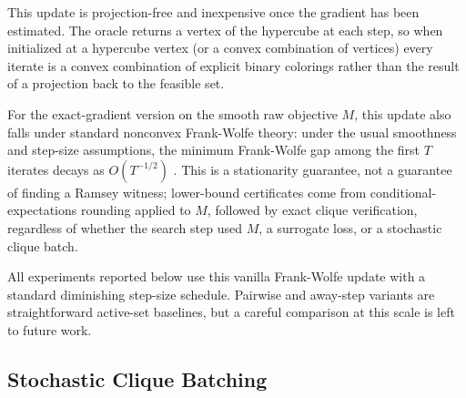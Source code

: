 \documentclass{article}
\begin{document}
This update is projection-free and inexpensive once the gradient has been estimated. The oracle returns a vertex of the hypercube at each step, so when initialized at a hypercube vertex (or a convex combination of vertices) every iterate is a convex combination of explicit binary colorings rather than the result of a projection back to the feasible set.

For the exact-gradient version on the smooth raw objective $M$, this update also falls under standard nonconvex Frank-Wolfe theory: under the usual smoothness and step-size assumptions, the minimum Frank-Wolfe gap among the first $T$ iterates decays as $O(T^{-1/2})$ \cite{lacostejulien2016convergence,braun2022conditional}. This is a stationarity guarantee, not a guarantee of finding a Ramsey witness; lower-bound certificates come from conditional-expectations rounding applied to $M$, followed by exact clique verification, regardless of whether the search step used $M$, a surrogate loss, or a stochastic clique batch.

All experiments reported below use this vanilla Frank-Wolfe update with a standard diminishing step-size schedule. Pairwise and away-step variants are straightforward active-set baselines, but a careful comparison at this scale is left to future work.


\subsection{Stochastic Clique Batching}\label{sec:batching}
\end{document}
